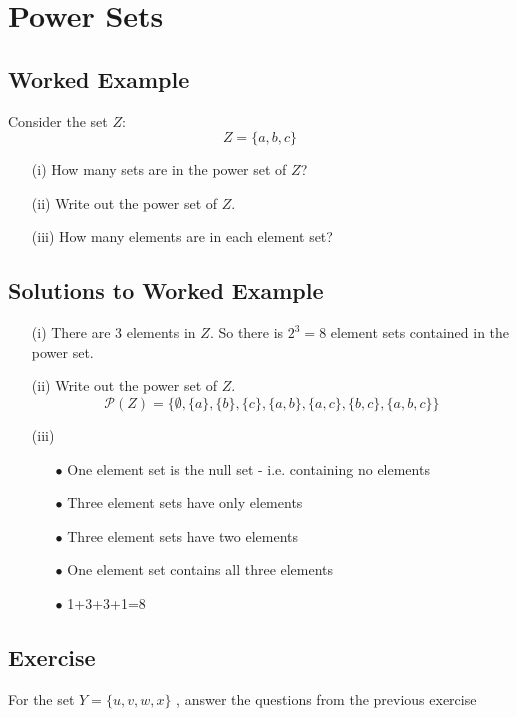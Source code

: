 \documentclass[a4paper,12pt]{article}
\begin{document}
\section*{Power Sets}
\subsection*{Worked Example}
Consider the set $Z$:
\[ Z = \{ a,b,c\}  \]
\begin{itemize}
\item[(i)] How many sets are in the power set of $Z$? 
\item[(ii)] Write out the power set of $Z$. 
\item[(iii)] How many elements are in each element set?
\end{itemize}
\subsection*{Solutions to Worked Example}

\begin{itemize}


\item[(i)] There are 3 elements in $Z$. So there is $2^3 = 8$ element sets contained in the power set.

\item[(ii)] Write out the power set of $Z$.
\[ \mathcal{P}(Z) = \{ \emptyset, \{a\}, \{b\}, \{c\}, \{a,b\}, \{a,c\}, \{b,c\}, \{a,b,c\} \} \]

\item[(iii)]
\begin{itemize}
\item[$\bullet$] One element set is the null set - i.e. containing no
elements \item[$\bullet$] Three element sets have only elements \item[$\bullet$]
Three element sets have two elements \item[$\bullet$] One element set
contains all three elements \item[$\bullet$] 1+3+3+1=8
\end{itemize}
\end{itemize}
\subsection*{Exercise}
For the set $Y = \{u,v,w,x\}$ , answer the questions from the
previous exercise


\end{document}
